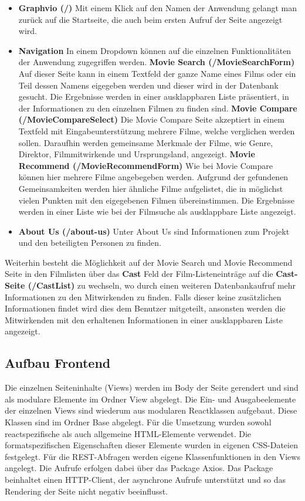 \documentclass[conference]{IEEEtran}
\begin{document}
\begin{itemize}
    \item \textbf{Graphvio (/)}
    Mit einem Klick auf den Namen der Anwendung gelangt man zurück auf die Startseite, die auch beim ersten Aufruf der Seite angezeigt wird.
    \smallskip
    \item \textbf{Navigation} 
    In einem Dropdown können auf die einzelnen Funktionalitäten der Anwendung zugegriffen werden.
    \smallskip
    \subitem \textbf{Movie Search (/MovieSearchForm)}
    Auf dieser Seite kann in einem Textfeld der ganze Name eines Films oder ein Teil dessen Namens eigegeben werden und dieser wird in der Datenbank gesucht. 
    Die Ergebnisse werden in einer ausklappbaren Liste präsentiert, in der Informationen zu den einzelnen Filmen zu finden sind.
    \smallskip
    \subitem \textbf{Movie Compare (/MovieCompareSelect)}
    Die Movie Compare Seite akzeptiert in einem Textfeld mit Eingabeunterstützung mehrere Filme, welche verglichen werden sollen. 
    Daraufhin werden gemeinsame Merkmale der Filme, wie Genre, Direktor, Filmmitwirkende und Ursprungsland, angezeigt.
    \smallskip
    \subitem \textbf{Movie Recommend (/MovieRecommendForm)}
    Wie bei Movie Compare können hier mehrere Filme angebegeben werden. Aufgrund der gefundenen Gemeinsamkeiten werden hier ähnliche Filme aufgelistet, die in möglichst vielen Punkten mit den eigegebenen Filmen übereinstimmen. Die Ergebnisse werden in einer Liste wie bei der Filmsuche als ausklappbare Liste angezeigt. 
    \smallskip
    \item \textbf{About Us (/about-us)}
    Unter About Us sind Informationen zum Projekt und den beteiligten Personen zu finden.
\end{itemize}

Weiterhin besteht die Möglichkeit auf der Movie Search und Movie Recommend Seite in den Filmlisten über das \textbf{Cast} Feld der Film-Listeneinträge auf die  \textbf{Cast-Seite (/CastList)} zu wechseln, wo durch einen weiteren Datenbankaufruf mehr Informationen zu den Mitwirkenden zu finden. Falls dieser keine zusätzlichen Informationen findet wird dies dem Benutzer mitgeteilt, ansonsten werden die Mitwirkenden mit den erhaltenen Informationen in einer ausklappbaren Liste angezeigt.

\subsection{Aufbau Frontend}

Die einzelnen Seiteninhalte (Views) werden im Body der Seite gerendert 
und sind als modulare Elemente im Ordner View abgelegt. 
Die Ein- und Ausgabeelemente der einzelnen Views sind wiederum aus modularen Reactklassen aufgebaut.
Diese Klassen sind im Ordner Base abgelegt. Für die Umsetzung wurden sowohl reactspezifische als auch 
allgemeine HTML-Elemente verwendet.
Die formatspezifischen Eigenschaften dieser Elemente wurden in eigenen CSS-Dateien festgelegt.
Für die REST-Abfragen werden eigene Klassenfunktionen in den Views angelegt.
Die Aufrufe erfolgen dabei über das Package Axios.\cite{axios}
Das Package beinhaltet einen HTTP-Client, 
der asynchrone Aufrufe unterstützt und so das Rendering der Seite nicht negativ beeinflusst.
\end{document}
